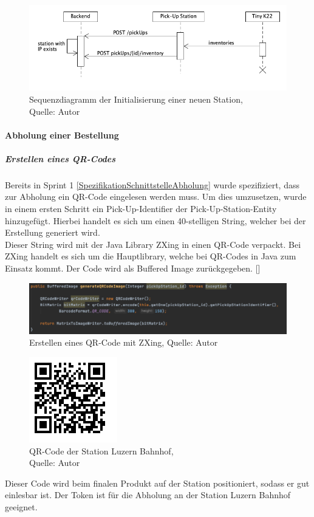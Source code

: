  \begin{figure}[H]
	\centering
	\includegraphics[width=1\textwidth]{images/stationInit.PNG}
	\caption[Sequenzdiagramm der Initialisierung einer neuen Station]{Sequenzdiagramm der Initialisierung einer neuen Station,\\ Quelle: Autor}
	\label{img: stationInitSequence}
\end{figure} 
\newpage
\paragraph{Abholung einer Bestellung}
\subparagraph{Erstellen eines QR-Codes}
Bereits in Sprint 1 \ref{SpezifikationSchnittstelleAbholung} wurde spezifiziert, dass zur Abholung ein QR-Code eingelesen werden muss. Um dies umzusetzen, wurde in einem ersten Schritt ein Pick-Up-Identifier der Pick-Up-Station-Entity hinzugefügt. Hierbei handelt es sich um einen 40-stelligen String, welcher bei der Erstellung generiert wird. \\
Dieser String wird mit der Java Library \glqq ZXing\grqq{} in einen QR-Code verpackt. Bei ZXing handelt es sich um die Hauptlibrary, welche bei QR-Codes in Java zum Einsatz kommt. Der Code wird als Buffered Image zurückgegeben. 
[\cite{qrCodeCreation}]
\begin{figure}[H]
	\centering
	\includegraphics[width=1\textwidth]{images/qrCodeCreation.PNG}
	\caption[Erstellen eines QR-Code mit ZXing]{Erstellen eines QR-Code mit ZXing, Quelle: Autor}
	\label{img: qrCodeCreation}
\end{figure} 

\begin{figure}[H]
	\centering
	\includegraphics[scale=0.4]{images/qrCodeStation.png}
	\caption[QR-Code der Station Luzern Bahnhof]{QR-Code der Station Luzern Bahnhof,\\ Quelle: Autor}
	\label{img: QRCodeStation}
\end{figure}
Dieser Code wird beim finalen Produkt auf der Station positioniert, sodass er gut einlesbar ist. 
Der Token ist für die Abholung an der Station \glqq Luzern Bahnhof\grqq{} geeignet. 

